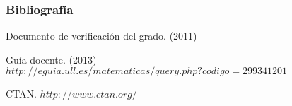 \documentclass{beamer}
\begin{document}

\begin{frame}
  \frametitle{Bibliografía}

  \begin{thebibliography}{10}

    \beamertemplatebookbibitems
    Documento de verificación del grado. 
    (2011) 

    \beamertemplatebookbibitems
    Guía docente. 
    (2013) 
    {\small $http://eguia.ull.es/matematicas/query.php?codigo=299341201$}

    \beamertemplatebookbibitems
    CTAN. {\small $http://www.ctan.org/$}

  \end{thebibliography}
  
\end{frame}
\end{document}
